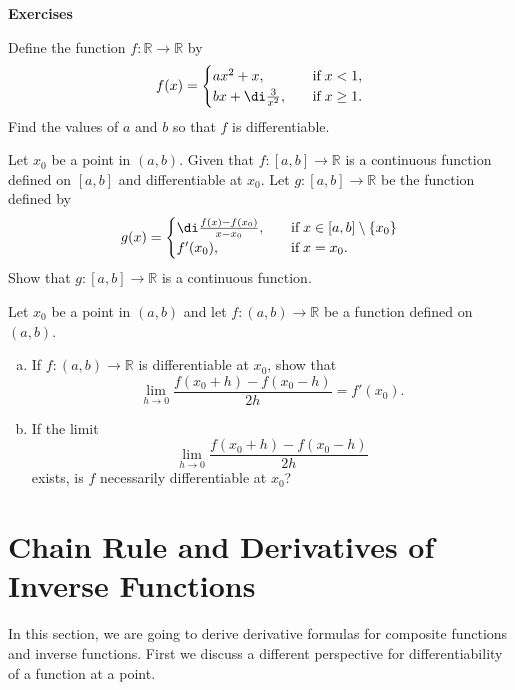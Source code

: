 \vp
 
\noindent
{\bf \large Exercises  \thesection}
\setcounter{myquestion}{1}
\begin{question}{\themyquestion} 
Define the function $f:\mathbb{R}\to\mathbb{R}$ by
\[f(x)=\begin{cases} ax^2+ x,\quad &\text{if}\;x< 1,\\
bx+\di \frac{3 }{x^2},\quad &\text{if}\;x\geq 1.\end{cases}
\]Find the values of $a$ and $b$ so that $f$ is differentiable.
\end{question}
\atc
\begin{question}{\themyquestion} 
Let $x_0$ be a point in $(a, b)$. Given that $f:[a,b]\to\mathbb{R}$ is a continuous function defined on $[a, b]$ and differentiable at $x_0$. Let
$g:[a,b]\to\mathbb{R}$ be the function defined by
\[g(x)=\begin{cases} \di\frac{f(x)-f(x_0)}{x-x_0},\quad& \text{if}\;x\in [a,b]\setminus\{ x_0\}\\f'(x_0),\quad & \text{if}\;x=x_0.\end{cases}\]Show that $g:[a,b]\to\mathbb{R}$ is a continuous function.
\end{question}
 
\atc
\begin{question}{\themyquestion} 
Let $x_0$ be a point in $(a, b)$ and let   $f:(a,b)\to\mathbb{R}$ be a function defined on $(a, b)$. 
\begin{enumerate}[(a)]
\item If $f:(a,b)\to\mathbb{R}$ is differentiable at $x_0$, show that
\[\lim_{h\to 0}\frac{f(x_0+h)-f(x_0-h)}{2h}=f'(x_0).\]
\item If the limit \[\lim_{h\to 0}\frac{f(x_0+h)-f(x_0-h)}{2h}\] exists, is $f$ necessarily differentiable at $x_0$?
\end{enumerate}
\end{question}


\vp

\section{Chain Rule and Derivatives of Inverse Functions}\label{sec3.2}

In this section, we are going to derive derivative formulas for composite functions and inverse functions. First we discuss a different perspective for differentiability of a function at a point.

